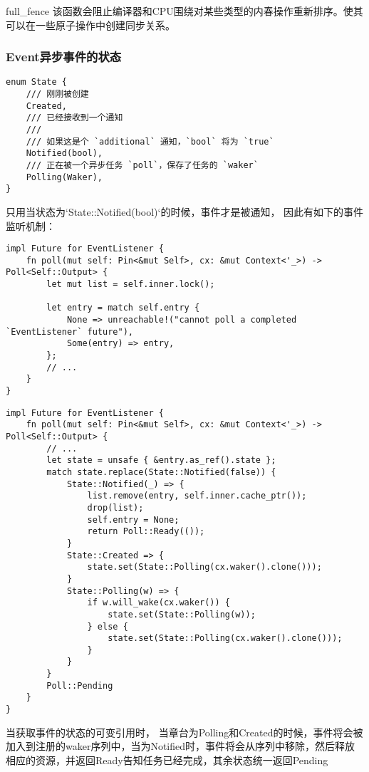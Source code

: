 full\_fence 该函数会阻止编译器和CPU围绕对某些类型的内春操作重新排序。使其可以在一些原子操作中创建同步关系。

\subsubsection{Event异步事件的状态}
\begin{lstlisting}[caption=Event的状态]
enum State {
    /// 刚刚被创建
    Created,
    /// 已经接收到一个通知
    ///
    /// 如果这是个 `additional` 通知，`bool` 将为 `true`
    Notified(bool),
    /// 正在被一个异步任务 `poll`，保存了任务的 `waker`
    Polling(Waker),
}
\end{lstlisting}

只用当状态为`State::Notified(bool)`的时候，事件才是被通知， 因此有如下的事件监听机制：

\begin{lstlisting}[caption=Event的事件获取并判断事件是否完成]
impl Future for EventListener {
    fn poll(mut self: Pin<&mut Self>, cx: &mut Context<'_>) -> Poll<Self::Output> {
        let mut list = self.inner.lock();

        let entry = match self.entry {
            None => unreachable!("cannot poll a completed `EventListener` future"),
            Some(entry) => entry,
        };
        // ...
    }
}
\end{lstlisting}


\begin{lstlisting}[caption=Event的事件Poll机制]
impl Future for EventListener {
    fn poll(mut self: Pin<&mut Self>, cx: &mut Context<'_>) -> Poll<Self::Output> {
        // ...
        let state = unsafe { &entry.as_ref().state };
        match state.replace(State::Notified(false)) {
            State::Notified(_) => {
                list.remove(entry, self.inner.cache_ptr());
                drop(list);
                self.entry = None;
                return Poll::Ready(());
            }
            State::Created => {
                state.set(State::Polling(cx.waker().clone()));
            }
            State::Polling(w) => {
                if w.will_wake(cx.waker()) {
                    state.set(State::Polling(w));
                } else {
                    state.set(State::Polling(cx.waker().clone()));
                }
            }
        }
        Poll::Pending
    }
}
\end{lstlisting}


当获取事件的状态的可变引用时， 当章台为Polling和Created的时候，事件将会被加入到注册的waker序列中，当为Notified时，事件将会从序列中移除，然后释放相应的资源，并返回Ready告知任务已经完成，其余状态统一返回Pending
